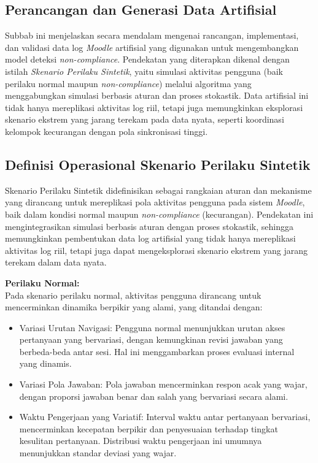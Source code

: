 \subsection{Perancangan dan Generasi Data Artifisial}
\label{sec:perancanganGenerasiDataArtifisial}
Subbab ini menjelaskan secara mendalam mengenai rancangan, implementasi, dan validasi data log \textit{Moodle} artifisial yang digunakan untuk mengembangkan model deteksi \textit{non-compliance}. Pendekatan yang diterapkan dikenal dengan istilah \textit{Skenario Perilaku Sintetik}, yaitu simulasi aktivitas pengguna (baik perilaku normal maupun \textit{non-compliance}) melalui algoritma yang menggabungkan simulasi berbasis aturan dan proses stokastik. Data artifisial ini tidak hanya mereplikasi aktivitas log riil, tetapi juga memungkinkan eksplorasi skenario ekstrem yang jarang terekam pada data nyata, seperti koordinasi kelompok kecurangan dengan pola sinkronisasi tinggi.

\subsection{Definisi Operasional Skenario Perilaku Sintetik}
\label{sec:definisiOperasionalSkenarioPerilakuSintetik}
Skenario Perilaku Sintetik didefinisikan sebagai rangkaian aturan dan mekanisme yang dirancang untuk mereplikasi pola aktivitas pengguna pada sistem \textit{Moodle}, baik dalam kondisi normal maupun \textit{non-compliance} (kecurangan). Pendekatan ini mengintegrasikan simulasi berbasis aturan dengan proses stokastik, sehingga memungkinkan pembentukan data log artifisial yang tidak hanya mereplikasi aktivitas log riil, tetapi juga dapat mengeksplorasi skenario ekstrem yang jarang terekam dalam data nyata.

\textbf{Perilaku Normal:} \\
Pada skenario perilaku normal, aktivitas pengguna dirancang untuk mencerminkan dinamika berpikir yang alami, yang ditandai dengan:
\begin{itemize}
    \item Variasi Urutan Navigasi: Pengguna normal menunjukkan urutan akses pertanyaan yang bervariasi, dengan kemungkinan revisi jawaban yang berbeda-beda antar sesi. Hal ini menggambarkan proses evaluasi internal yang dinamis.
    \item Variasi Pola Jawaban: Pola jawaban mencerminkan respon acak yang wajar, dengan proporsi jawaban benar dan salah yang bervariasi secara alami.
    \item Waktu Pengerjaan yang Variatif: Interval waktu antar pertanyaan bervariasi, mencerminkan kecepatan berpikir dan penyesuaian terhadap tingkat kesulitan pertanyaan. Distribusi waktu pengerjaan ini umumnya menunjukkan standar deviasi yang wajar.
\end{itemize}


